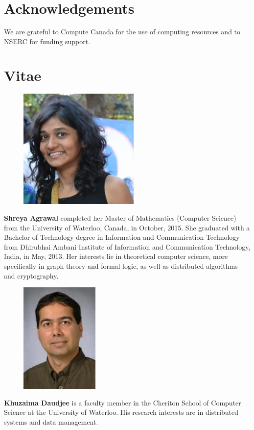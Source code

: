 \section{Acknowledgements}
We are grateful to Compute Canada for the use of computing resources and to NSERC for funding support.

\section{Vitae}

\begin{figure}
    \includegraphics[scale=0.4]{shreya.jpg}
\end{figure}

\textbf{Shreya Agrawal} completed her Master of Mathematics (Computer Science) from the University of Waterloo, Canada, in October, 2015. She graduated with a Bachelor of Technology degree in Information and Communication Technology from Dhirubhai Ambani Institute of Information and Communication Technology, India, in May, 2013. Her interests lie in theoretical computer science, more specifically in graph theory and formal logic, as well as distributed algorithms and cryptography. \\


\begin{figure}
    \vspace{-10pt}
    \includegraphics[scale=0.5]{kdaudjee.jpg}
\end{figure}

\textbf{Khuzaima Daudjee} is a faculty member in the Cheriton School of Computer
Science at the University of Waterloo. His research interests are in
distributed systems and data management.


